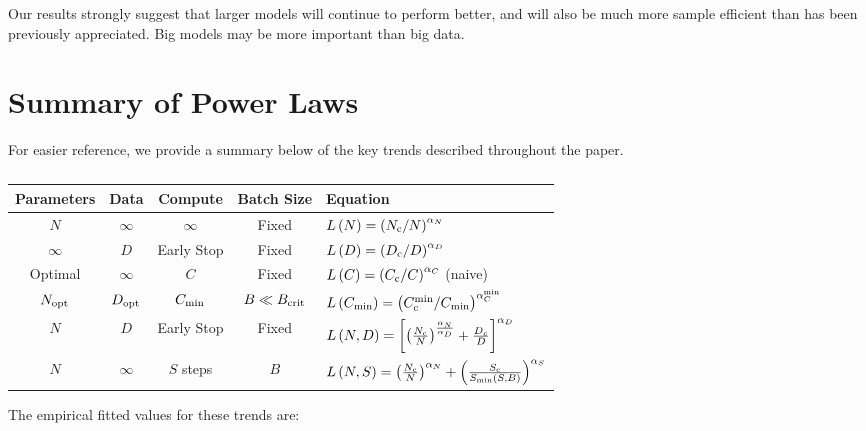 \documentclass[english]{article}
\begin{document}
Our results strongly suggest that larger models will continue to perform better, and will also be much more sample efficient than has been previously appreciated.  Big models may be more important than big data.

\newpage
\appendix
\appendixpage
\addappheadtotoc 


\section{Summary of Power Laws}

For easier reference, we provide a summary below of the key trends described throughout the paper.

\begin{table}[h!]
\centering
\vspace{-0.5em}
\begin{tabular}{|c|c|c|c|l|}
\hline 
\textbf{Parameters}  & \textbf{Data}  & \textbf{Compute}  & \textbf{Batch Size}  & \textbf{Equation}\tabularnewline
\hline 
\hline 
$N$  & $\infty$  & \multicolumn{1}{c|}{$\infty$ } & Fixed  & $L\left(N\right)=\left(N_{{\rm c}}/N\right)^{\alpha_{N}}$\tabularnewline
\hline 
$\infty$  & $D$  & \multicolumn{1}{c|}{Early Stop } & Fixed  & $L\left(D\right)=\left(D_{{\rm c}}/D\right)^{\alpha_{D}}$\tabularnewline
\hline 
Optimal  & $\infty$  & $C$  & Fixed  & $L\left(C\right)=\left(C_{{\rm c}}/C\right)^{\alpha_{C}}$ (naive)\tabularnewline
\hline 
$N_{{\rm opt}}$ & $D_{{\rm opt}}$ & $C_{{\rm min}}$  & $B\ll B_{{\rm crit}}$  & $L\left(C_{{\rm min}}\right)=\left(C_{{\rm c}}^{{\rm min}}/C_{{\rm min}}\right)^{\alpha_{C}^{{\rm min}}}$\tabularnewline
\hline 
$N$  & $D$  & \multicolumn{1}{c|}{Early Stop } & Fixed  & $L\left(N,D\right)=\left[\left(\frac{N_{{\rm c}}}{N}\right)^{\frac{\alpha_{N}}{\alpha_{D}}}+\frac{D_{c}}{D}\right]^{\alpha_{D}}$\tabularnewline
\hline 
$N$  & $\infty$  & $S$ steps & $B$  & $L\left(N,S\right)=\left(\frac{N_{{\rm c}}}{N}\right)^{\alpha_{N}}+\left(\frac{S_{{\rm c}}}{S_{{\rm min}}\left(S,B\right)}\right)^{\alpha_{S}}$\tabularnewline
\hline 
\end{tabular}
\vspace{0.5em}
\caption[Key trend equations]{}
\vspace{-1em}
\end{table}

The empirical fitted values for these trends are:
\end{document}
